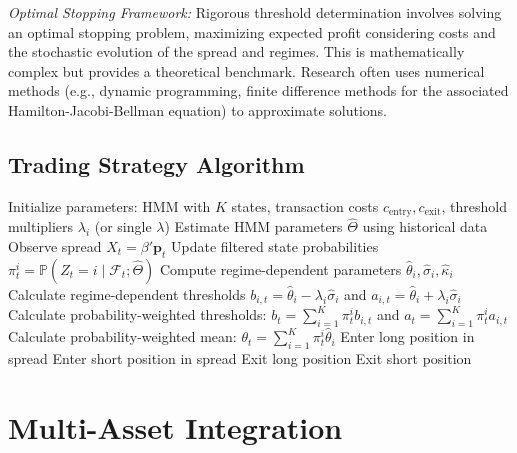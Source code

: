 \documentclass{article}
\begin{document}
\textit{Optimal Stopping Framework:} Rigorous threshold determination involves solving an optimal stopping problem, maximizing expected profit considering costs and the stochastic evolution of the spread and regimes. This is mathematically complex but provides a theoretical benchmark. Research often uses numerical methods (e.g., dynamic programming, finite difference methods for the associated Hamilton-Jacobi-Bellman equation) to approximate solutions.

\subsection{Trading Strategy Algorithm}

\begin{algorithm}
\caption{HMM-Based Statistical Arbitrage Strategy}
\begin{algorithmic}[1]
\STATE Initialize parameters: HMM with $K$ states, transaction costs $c_{\text{entry}}, c_{\text{exit}}$, threshold multipliers $\lambda_i$ (or single $\lambda$)
\STATE Estimate HMM parameters $\hat{\Theta}$ using historical data
\LOOP
    \STATE Observe spread $X_t = \beta' \mathbf{p}_t$
    \STATE Update filtered state probabilities $\pi_t^i = \mathbb{P}(Z_t = i \mid \mathcal{F}_t; \hat{\Theta})$
    \STATE Compute regime-dependent parameters $\hat{\theta}_i, \hat{\sigma}_i, \hat{\kappa}_i$
    \STATE Calculate regime-dependent thresholds $b_{i,t} = \hat{\theta}_i - \lambda_i \hat{\sigma}_i$ and $a_{i,t} = \hat{\theta}_i + \lambda_i \hat{\sigma}_i$
    \STATE Calculate probability-weighted thresholds: $b_t = \sum_{i=1}^K \pi_t^i b_{i,t}$ and $a_t = \sum_{i=1}^K \pi_t^i a_{i,t}$
    \STATE Calculate probability-weighted mean: $\theta_t = \sum_{i=1}^K \pi_t^i \hat{\theta}_i$
        \STATE Enter long position in spread
        \STATE Enter short position in spread
     
        \STATE Exit long position
     
        \STATE Exit short position
    \ENDIF
\ENDLOOP
\end{algorithmic}
\end{algorithm}

\section{Multi-Asset Integration}
\end{document}
